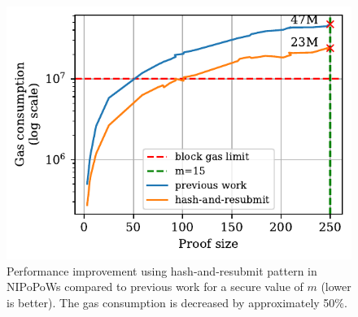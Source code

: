 \begin{figure}[!h]
    \begin{center}
        \includegraphics[width=0.9\columnwidth]{figures/har-nipopows.pdf}
    \end{center}
\vspace*{-5mm}
    \caption{Performance improvement using hash-and-resubmit pattern in
        NIPoPoWs compared to previous work for a secure value of $m$ (lower is
        better). The gas consumption is decreased by approximately 50\%.}
    \label{fig:har-nipopow}
\vspace*{-5mm}
\end{figure}
